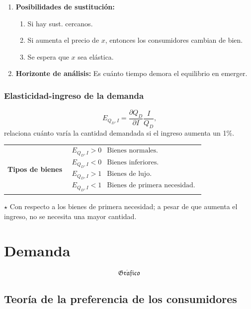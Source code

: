 \documentclass{report}
\newcommand{\GRAF}{\begin{center}$$\mathfrak{Gr\acute{a}fico}$$\end{center}}
\newenvironment{obs}{$\star$ }{}
\newenvironment{definition}[1]{\begin{center}
\begin{tabular}{p{3.5cm} p{12.5cm}}
\textbf{#1} &
}
{\\ \end{tabular}\end{center}}
\begin{document}
\begin{enumerate}
\item \textbf{Posibilidades de sustitución:}
\begin{enumerate}
\item Si hay sust. cercanos.
\item Si aumenta el precio de $x$, entonces los consumidores cambian de bien.
\item Se espera que $x$ sea elástica.
\end{enumerate}
\item \textbf{Horizonte de análisis:} Es cuánto tiempo demora el equilibrio en emerger.
\end{enumerate}

\subsection{Elasticidad-ingreso de la demanda}

$$E_{Q_D,I}=\frac{\partial Q_D}{\partial I}\frac{I}{Q_D}\text{,}$$
relaciona cuánto varía la cantidad demandada si el ingreso aumenta un 1\%.

\begin{definition}{Tipos de bienes}
$$\begin{matrix}
E_{Q_D,I}>0 & \text{Bienes normales.} \\
E_{Q_D,I}<0 & \text{Bienes inferiores.} \\
E_{Q_D,I}>1 & \text{Bienes de lujo.} \\
E_{Q_D,I}<1 & \text{Bienes de primera necesidad.}
\end{matrix}$$
\end{definition}

\begin{obs}
Con respecto a los bienes de primera necesidad; a pesar de que aumenta el ingreso, no se necesita una mayor cantidad.
\end{obs}

\chapter{Demanda}

\thispagestyle{fancy}

\GRAF

\section{Teoría de la preferencia de los consumidores}
\end{document}
